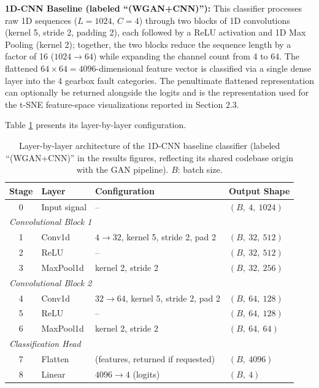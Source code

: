 \documentclass[12pt]{article}
\begin{document}
\textbf{1D-CNN Baseline (labeled ``(WGAN+CNN)''):} This classifier processes raw 1D sequences ($L=1024$, $C=4$) through two blocks of 1D convolutions (kernel 5, stride 2, padding 2), each followed by a ReLU activation and 1D Max Pooling (kernel 2); together, the two blocks reduce the sequence length by a factor of 16 ($1024\to64$) while expanding the channel count from 4 to 64. The flattened $64\times64=4096$-dimensional feature vector is classified via a single dense layer into the 4 gearbox fault categories. The penultimate flattened representation can optionally be returned alongside the logits and is the representation used for the t-SNE feature-space visualizations reported in Section 2.3.

Table \ref{tab:classifier} presents its layer-by-layer configuration.

\begin{table}[H]
\centering
\caption{Layer-by-layer architecture of the 1D-CNN baseline classifier (labeled ``(WGAN+CNN)'' in the results figures, reflecting its shared codebase origin with the GAN pipeline). $B$: batch size.}
\label{tab:classifier}
\begin{tabular}{@{}clll@{}}
\toprule
\textbf{Stage} & \textbf{Layer} & \textbf{Configuration} & \textbf{Output Shape} \\
\midrule
0 & Input signal & -- & $(B,\ 4,\ 1024)$ \\
\midrule
\multicolumn{4}{l}{\textit{Convolutional Block 1}} \\
1 & Conv1d & $4{\to}32$, kernel 5, stride 2, pad 2 & $(B,\ 32,\ 512)$ \\
2 & ReLU & -- & $(B,\ 32,\ 512)$ \\
3 & MaxPool1d & kernel 2, stride 2 & $(B,\ 32,\ 256)$ \\
\midrule
\multicolumn{4}{l}{\textit{Convolutional Block 2}} \\
4 & Conv1d & $32{\to}64$, kernel 5, stride 2, pad 2 & $(B,\ 64,\ 128)$ \\
5 & ReLU & -- & $(B,\ 64,\ 128)$ \\
6 & MaxPool1d & kernel 2, stride 2 & $(B,\ 64,\ 64)$ \\
\midrule
\multicolumn{4}{l}{\textit{Classification Head}} \\
7 & Flatten & (features, returned if requested) & $(B,\ 4096)$ \\
8 & Linear & $4096 \to 4$ (logits) & $(B,\ 4)$ \\
\bottomrule
\end{tabular}
\end{table}
\end{document}
